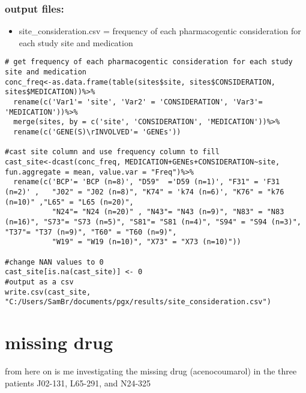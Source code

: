 \documentclass[]{article}
\providecommand{\tightlist}{%
  \setlength{\itemsep}{0pt}\setlength{\parskip}{0pt}}
\begin{document}
\subsubsection{output files:}\label{output-files-6}

\begin{itemize}
\tightlist
\item
  site\_consideration.csv = frequency of each pharmacogentic
  consideration for each study site and medication
\end{itemize}

\begin{verbatim}
# get frequency of each pharmacogentic consideration for each study site and medication 
conc_freq<-as.data.frame(table(sites$site, sites$CONSIDERATION, sites$MEDICATION))%>%
  rename(c('Var1'= 'site', 'Var2' = 'CONSIDERATION', 'Var3'= 'MEDICATION'))%>%
  merge(sites, by = c('site', 'CONSIDERATION', 'MEDICATION'))%>%
  rename(c('GENE(S)\rINVOLVED'= 'GENEs'))

#cast site column and use frequency column to fill
cast_site<-dcast(conc_freq, MEDICATION+GENEs+CONSIDERATION~site, fun.aggregate = mean, value.var = "Freq")%>%
  rename(c('BCP'= 'BCP (n=8)', "D59"  ='D59 (n=1)', "F31" = 'F31 (n=2)' ,   "J02" = "J02 (n=8)", "K74" = 'k74 (n=6)', "K76" = "k76 (n=10)" ,"L65" = "L65 (n=20)",
           "N24"= "N24 (n=20)" , "N43"= "N43 (n=9)", "N83" = "N83 (n=16)", "S73"= "S73 (n=5)", "S81"= "S81 (n=4)", "S94" = "S94 (n=3)", "T37"= "T37 (n=9)", "T60" = "T60 (n=9)", 
           "W19" = "W19 (n=10)", "X73" = "X73 (n=10)"))

#change NAN values to 0 
cast_site[is.na(cast_site)] <- 0
#output as a csv 
write.csv(cast_site, "C:/Users/SamBr/documents/pgx/results/site_consideration.csv")
\end{verbatim}

\section{missing drug}\label{missing-drug}

from here on is me investigating the missing drug (acenocoumarol) in the
three patients J02-131, L65-291, and N24-325
\end{document}
